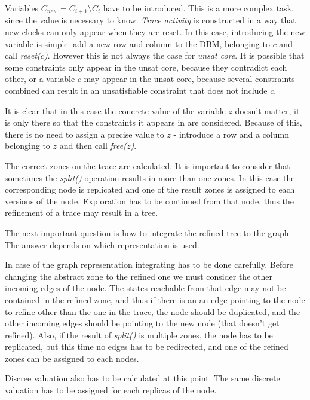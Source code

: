 Variables $C_{new}=C_{i+1} \setminus C_i$ have to be introduced. This is a more complex task, since the value is necessary to know. \emph{Trace activity} is constructed in a way that new clocks can only appear when they are reset. In this case, introducing the new variable is simple: add a new row and column to the DBM, belonging to $c$ and call \emph{reset($c$)}. However this is not always the case for \emph{unsat core}. It is possible that some constraints only appear in the unsat core, because they contradict each other, or a variable $c$ may appear in the unsat core, because several constraints combined can result in an unsatisfiable constraint that does not include $c$. 


It is clear that in this case the concrete value of the variable $z$ doesn't matter, it is only there so that the constraints it appears in are considered. Because of this, there is no need to assign a precise value to $z$ - introduce a row and a column belonging to $z$ and then call \emph{free($z$)}.

The correct zones on the trace are calculated. It is important to consider that sometimes the \emph{split()} operation results in more than one zones. In this case the corresponding node is replicated and one of the result zones is assigned to each versions of the node. Exploration has to be continued from that node, thus the refinement of a trace may result in a tree.


The next important question is how to integrate the refined tree to the graph. The answer depends on which representation is used.

In case of the graph representation integrating has to be done carefully. Before changing the abstract zone to the refined one we must consider the other incoming edges of the node. The states reachable from that edge may not be contained in the refined zone, and thus if there is an an edge pointing to the node to refine other than the one in the trace, the node should be duplicated, and the other incoming edges should be pointing to the new node (that doesn't get refined). Also, if the result of \emph{split()} is multiple zones, the node has to be replicated, but this time no edges has to be redirected, and one of the refined zones can be assigned to each nodes.

Discree valuation also has to be calculated at this point. The same discrete valuation has to be assigned for each replicas of the node.

